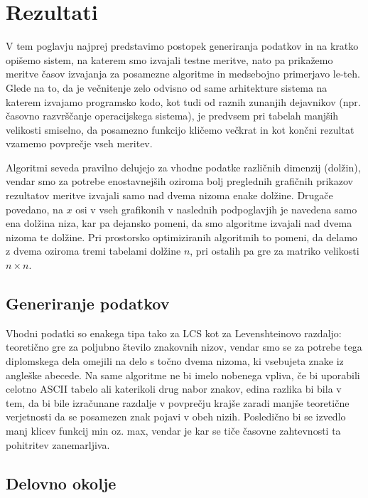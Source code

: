\documentclass[a4paper,12pt,openright]{book}
\begin{document}
\chapter{Rezultati}

V tem poglavju najprej predstavimo postopek generiranja podatkov in na kratko opišemo sistem, na katerem smo izvajali testne meritve, nato pa prikažemo meritve časov izvajanja za posamezne algoritme in medsebojno primerjavo le-teh. Glede na to, da je večnitenje zelo odvisno od same arhitekture sistema na katerem izvajamo programsko kodo, kot tudi od raznih zunanjih dejavnikov (npr. časovno razvrščanje operacijskega sistema), je predvsem pri tabelah manjših velikosti smiselno, da posamezno funkcijo kličemo večkrat in kot končni rezultat vzamemo povprečje vseh meritev. 

Algoritmi seveda pravilno delujejo za vhodne podatke različnih dimenzij (dolžin), vendar smo za potrebe enostavnejših oziroma bolj preglednih grafičnih prikazov rezultatov meritve izvajali samo nad dvema nizoma enake dolžine. Drugače povedano, na $x$ osi v vseh grafikonih v naslednih podpoglavjih je navedena samo ena dolžina niza, kar pa dejansko pomeni, da smo algoritme izvajali nad dvema nizoma te dolžine. Pri prostorsko optimiziranih algoritmih to pomeni, da delamo z dvema oziroma tremi tabelami dolžine $n$, pri ostalih pa gre za matriko velikosti $n \times n$. 

\section{Generiranje podatkov}

Vhodni podatki so enakega tipa tako za LCS kot za Levenshteinovo razdaljo: teoretično gre za poljubno število znakovnih nizov, vendar smo se za potrebe tega diplomskega dela omejili na delo s točno dvema nizoma, ki vsebujeta znake iz angleške abecede. Na same algoritme ne bi imelo nobenega vpliva, če bi uporabili celotno ASCII tabelo ali katerikoli drug nabor znakov, edina razlika bi bila v tem, da bi bile izračunane razdalje v povprečju krajše zaradi manjše teoretične verjetnosti da se posamezen znak pojavi v obeh nizih. Posledično bi se izvedlo manj klicev funkcij min oz. max, vendar je kar se tiče časovne zahtevnosti ta pohitritev zanemarljiva. 

\section{Delovno okolje}
\end{document}

